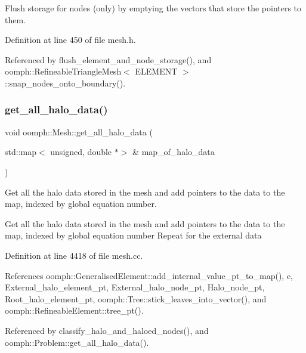 Flush storage for nodes (only) by emptying the vectors that store the pointers to them. 



Definition at line 450 of file mesh.\+h.



Referenced by flush\+\_\+element\+\_\+and\+\_\+node\+\_\+storage(), and oomph\+::\+Refineable\+Triangle\+Mesh$<$ E\+L\+E\+M\+E\+N\+T $>$\+::snap\+\_\+nodes\+\_\+onto\+\_\+boundary().

\mbox{\label{classoomph_1_1Mesh_ae212c9c9be3a640552cf967b9583667c}} 
\subsubsection{\texorpdfstring{get\+\_\+all\+\_\+halo\+\_\+data()}{get\_all\_halo\_data()}}
{\footnotesize\ttfamily void oomph\+::\+Mesh\+::get\+\_\+all\+\_\+halo\+\_\+data (\begin{DoxyParamCaption}\item[{std\+::map$<$ unsigned, double $\ast$$>$ \&}]{map\+\_\+of\+\_\+halo\+\_\+data }\end{DoxyParamCaption})}



Get all the halo data stored in the mesh and add pointers to the data to the map, indexed by global equation number. 

Get all the halo data stored in the mesh and add pointers to the data to the map, indexed by global equation number Repeat for the external data 

Definition at line 4418 of file mesh.\+cc.



References oomph\+::\+Generalised\+Element\+::add\+\_\+internal\+\_\+value\+\_\+pt\+\_\+to\+\_\+map(), e, External\+\_\+halo\+\_\+element\+\_\+pt, External\+\_\+halo\+\_\+node\+\_\+pt, Halo\+\_\+node\+\_\+pt, Root\+\_\+halo\+\_\+element\+\_\+pt, oomph\+::\+Tree\+::stick\+\_\+leaves\+\_\+into\+\_\+vector(), and oomph\+::\+Refineable\+Element\+::tree\+\_\+pt().



Referenced by classify\+\_\+halo\+\_\+and\+\_\+haloed\+\_\+nodes(), and oomph\+::\+Problem\+::get\+\_\+all\+\_\+halo\+\_\+data().

